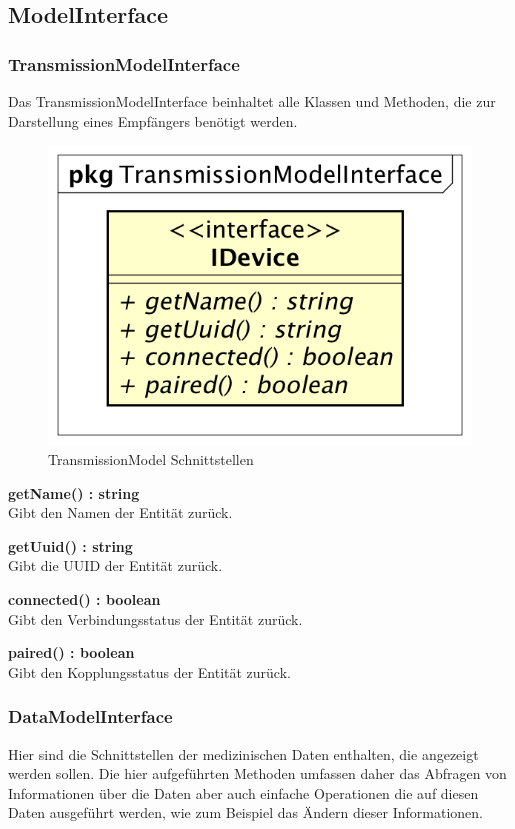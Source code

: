\documentclass[a4paper]{scrreprt}
\begin{document}
\subsection{ModelInterface}
\subsubsection{TransmissionModelInterface}

Das TransmissionModelInterface beinhaltet alle Klassen und Methoden, die zur Darstellung eines Empfängers benötigt werden. 

\begin{figure}[H]
\centering
\includegraphics[width=0.45\textheight]{graphics/Klassendiagramme/Model/TransmissionModelInterfacePackage.png}
\caption{TransmissionModel Schnittstellen}
\end{figure}

\textbf{getName() : string}\\
Gibt den Namen der Entität zurück.

\textbf{getUuid() : string}\\
Gibt die UUID der Entität zurück.

\textbf{connected() : boolean}\\
Gibt den Verbindungsstatus der Entität zurück.

\textbf{paired() : boolean}\\
Gibt den Kopplungsstatus der Entität zurück.

\subsubsection{DataModelInterface}
Hier sind die Schnittstellen der medizinischen Daten enthalten, die angezeigt werden sollen. Die hier aufgeführten Methoden umfassen daher das Abfragen von Informationen über die Daten aber auch einfache Operationen die auf diesen Daten ausgeführt werden, wie zum Beispiel das Ändern dieser Informationen.
\end{document}
